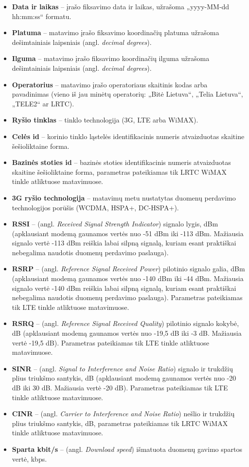 \documentclass{VUMIFPSbakalaurinis}
\begin{document}
\begin{itemize}
	\item \textbf{Data ir laikas} – įrašo fiksavimo data ir laikas, užrašoma „yyyy-MM-dd hh:mm:ss“ formatu.
	\item \textbf{Platuma} – matavimo įrašo fiksavimo koordinačių platuma užrašoma dešimtainiais laipsniais (angl. \textit{decimal degrees}).
	\item \textbf{Ilguma} – matavimo įrašo fiksavimo koordinačių ilguma užrašoma dešimtainiais laipsniais (angl. \textit{decimal degrees}).
	\item \textbf{Operatorius} – matavimo įrašo operatoriaus skaitinis kodas arba pavadinimas (vieno iš jau minėtų operatorių: „Bitė Lietuva“, „Telia Lietuva“, „TELE2“ ar LRTC).
	\item \textbf{Ryšio tinklas} – tinklo technologija (3G, LTE arba WiMAX).
	\item \textbf{Celės id} – korinio tinklo ląstelės identifikacinis numeris atvaizduotas skaitine šešioliktaine forma.
	\item \textbf{Bazinės stoties id} – bazinės stoties identifikacinis numeris atvaizduotas skaitine šešioliktaine forma, parametras pateikiamas tik LRTC WiMAX tinkle atliktuose matavimuose.
	\item \textbf{3G ryšio technologija} – matavimų metu nustatytas duomenų perdavimo technologijos porūšis (WCDMA, HSPA+, DC-HSPA+).
	\item \textbf{RSSI} – (angl. \textit{Received Signal Strength Indicator}) signalo lygis, dBm (apklausiant modemą gaunamos vertės nuo -51 dBm iki -113 dBm. Mažiausia signalo vertė -113 dBm reiškia labai silpną signalą, kuriam esant praktiškai nebegalima naudotis duomenų perdavimo paslauga).
	\item \textbf{RSRP} – (angl. \textit{Reference Signal Received Power}) pilotinio signalo galia, dBm (apklausiant modemą gaunamos vertės nuo -140 dBm iki -44 dBm. Mažiausia signalo vertė -140 dBm reiškia labai silpną signalą, kuriam esant praktiškai nebegalima naudotis duomenų perdavimo paslauga). Parametras pateikiamas tik LTE tinkle atliktuose matavimuose.
	\item \textbf{RSRQ} – (angl. \textit{Reference Signal Received Quality}) pilotinio signalo kokybė, dB (apklausiant modemą gaunamos vertės nuo -19,5 dB iki -3 dB. Mažiausia vertė -19,5 dB). Parametras pateikiamas tik LTE tinkle atliktuose matavimuose.
	\item \textbf{SINR} – (angl. \textit{Signal to Interference and Noise Ratio})  signalo ir trukdžių plius triukšmo santykis, dB (apklausiant modemą gaunamos vertės nuo -20 dB iki 30 dB. Mažiausia vertė -20 dB). Parametras pateikiamas tik LTE tinkle atliktuose matavimuose.
	\item \textbf{CINR} – (angl. \textit{Carrier to Interference and Noise Ratio}) nešlio ir trukdžių plius triukšmo santykis, dB, parametras pateikiamas tik LRTC WiMAX tinkle atliktuose matavimuose.
	\item \textbf{Sparta kbit/s} – (angl. \textit{Download speed}) išmatuota duomenų gavimo spartos vertė, kbps.
\end{itemize}
\end{document}
